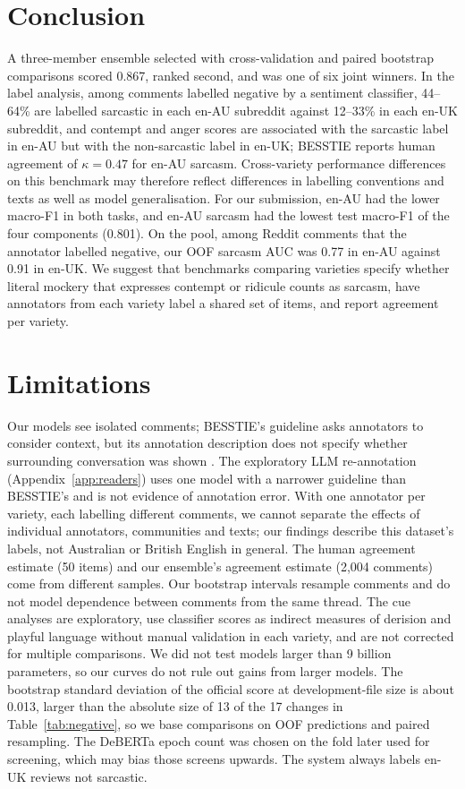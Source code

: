 \documentclass[11pt]{article}
\begin{document}
\section{Conclusion}
\label{sec:conclusion}
A three-member ensemble selected with cross-validation and paired bootstrap comparisons scored 0.867, ranked second, and
was one of six joint winners. In the label analysis, among comments labelled negative by a sentiment classifier, 44--64\%
are labelled sarcastic in each en-AU subreddit against 12--33\% in each en-UK subreddit, and contempt and anger scores
are associated with the sarcastic label in en-AU but with the non-sarcastic label in en-UK; BESSTIE reports human
agreement of $\kappa=0.47$ for en-AU sarcasm. Cross-variety performance differences on this benchmark may therefore
reflect differences in labelling conventions and texts as well as model generalisation. For our submission, en-AU had
the lower macro-F1 in both tasks, and en-AU sarcasm had the lowest test macro-F1 of the four components (0.801). On
the pool, among Reddit comments that the annotator labelled negative, our OOF sarcasm AUC was 0.77 in en-AU against
0.91 in en-UK. We suggest that benchmarks comparing varieties specify
whether literal mockery that expresses contempt or ridicule counts as sarcasm, have annotators from each variety label a
shared set of items, and report agreement per variety.

\section*{Limitations}
Our models see isolated comments; BESSTIE's guideline asks annotators to consider context, but its annotation description
does not specify whether surrounding conversation was shown \citep{srirag-etal-2025-besstie}. The exploratory LLM
re-annotation (Appendix~\ref{app:readers}) uses one model with a narrower guideline than BESSTIE's and is not evidence
of annotation error. With one annotator per variety, each labelling different comments, we cannot separate the effects
of individual annotators, communities and texts; our findings describe this dataset's labels, not Australian or British
English in general. The human agreement estimate (50 items) and our ensemble's agreement estimate (2,004 comments) come
from different samples. Our bootstrap intervals resample comments and do not model dependence between comments from the
same thread. The cue analyses are exploratory, use classifier scores as indirect measures of derision and playful
language without manual validation in each variety, and are not corrected for multiple comparisons. We did not test
models larger than 9 billion parameters, so our curves do not rule out gains from larger models. The bootstrap standard
deviation of the official score at development-file size is about 0.013, larger than the absolute size of 13 of the 17 changes in
Table~\ref{tab:negative}, so we base comparisons on OOF predictions and paired resampling. The DeBERTa epoch count was chosen on
the fold later used for screening, which may bias those screens upwards. The system always labels en-UK reviews not
sarcastic.
\end{document}
